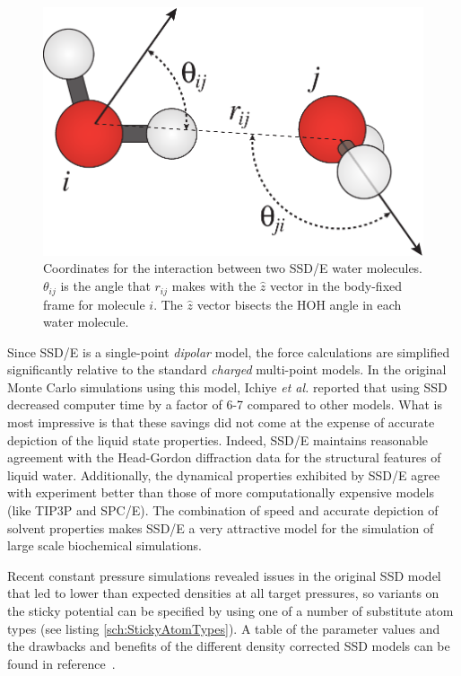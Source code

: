 \documentclass[]{book}
\begin{document}
\begin{figure}
\centering
\includegraphics[width=\linewidth]{waterAngle.pdf}
\caption[Coordinate definition for the SSD/E water model]{Coordinates
for the interaction between two SSD/E water molecules.  $\theta_{ij}$
is the angle that $r_{ij}$ makes with the $\hat{z}$ vector in the
body-fixed frame for molecule $i$.  The $\hat{z}$ vector bisects the
HOH angle in each water molecule. } 
\label{fig:ssd}
\end{figure}

Since SSD/E is a single-point {\it dipolar} model, the force
calculations are simplified significantly relative to the standard
{\it charged} multi-point models. In the original Monte Carlo
simulations using this model, Ichiye {\it et al.} reported that using
SSD decreased computer time by a factor of 6-7 compared to other
models.\cite{liu96:new_model} What is most impressive is that these
savings did not come at the expense of accurate depiction of the
liquid state properties.  Indeed, SSD/E maintains reasonable agreement
with the Head-Gordon diffraction data for the structural features of
liquid water.\cite{hura00,liu96:new_model} Additionally, the dynamical
properties exhibited by SSD/E agree with experiment better than those
of more computationally expensive models (like TIP3P and
SPC/E).\cite{chandra99:ssd_md} The combination of speed and accurate
depiction of solvent properties makes SSD/E a very attractive model
for the simulation of large scale biochemical simulations.

Recent constant pressure simulations revealed issues in the original
SSD model that led to lower than expected densities at all target
pressures,\cite{Ichiye03,fennell04} so variants on the sticky
potential can be specified by using one of a number of substitute atom
types (see listing \ref{sch:StickyAtomTypes}).  A table of the
parameter values and the drawbacks and benefits of the different
density corrected SSD models can be found in
reference~\citealp{fennell04}.
\end{document}
